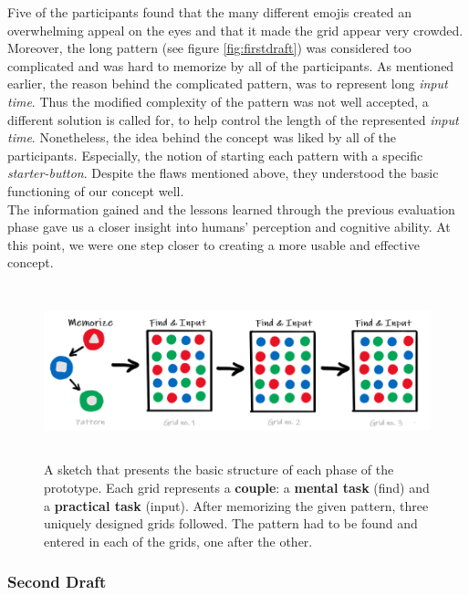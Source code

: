 Five of the participants found that the many different emojis created an overwhelming appeal on the eyes and that it made the grid appear very crowded. Moreover, the long pattern (see figure \ref{fig:firstdraft}) was considered too complicated and was hard to memorize by all of the participants. As mentioned earlier, the reason behind the complicated pattern, was to represent long \textit{input time}. Thus the modified complexity of the pattern was not well accepted, a different solution is called for, to help control the length of the represented \textit{input time}. Nonetheless, the idea behind the concept was liked by all of the participants. Especially, the notion of starting each pattern with a specific \textit{starter-button}. Despite the flaws mentioned above, they understood the basic functioning of our concept well. \\

The information gained and the lessons learned through the previous evaluation phase gave us a closer insight into humans' perception and cognitive ability. At this point, we were one step closer to creating a more usable and effective concept.

\begin{figure}[t!]
\centering
\includegraphics[width=13cm, height=5cm]{Chapters/graphics/seconddraft.PNG}
\caption{A sketch that presents the basic structure of each phase of the prototype. Each grid represents a \textbf{couple}: a \textbf{mental task} (find) and a \textbf{practical task} (input). After memorizing the given pattern, three uniquely designed grids followed. The pattern had to be found and entered in each of the grids, one after the other.}
\label{fig:secondDraft}
\end{figure}

\subsubsection{Second Draft} \label{4.2.2.3}

